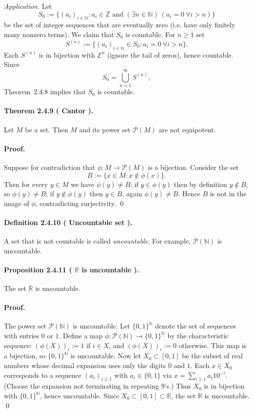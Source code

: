 \documentclass[12pt,a4paper]{article}
\newcommand{\N}{\mathbb{N}}
\newcommand{\Z}{\mathbb{Z}}
\newcommand{\R}{\mathbb{R}}
\newcommand{\NumberedDefinition}[3]{%
\paragraph*{Definition #1 ( #2 ).} #3\par}
\newcommand{\NumberedTheorem}[3]{%
\paragraph*{Theorem #1 ( #2 ).} #3\par}
\newcommand{\NumberedProposition}[3]{%
\paragraph*{Proposition #1 ( #2 ).} #3\par}
\theoremstyle{plain}
\theoremstyle{definition}
\theoremstyle{remark}
\begin{document}
\emph{Application.} Let
\[
	S_0 := \{ (a_i)_{i\in\N} : a_i\in\Z \text{ and } (\exists n\in\N)\ (a_i=0 \ \forall i>n)\}
\]
be the set of integer sequences that are eventually zero (i.e. have only finitely many nonzero terms). We claim that $S_0$ is countable. For $n\ge1$ set
\[
	S^{(n)} := \{ (a_i)_{i\in\N} \in S_0 : a_i=0 \ \forall i>n\}.
\]
Each $S^{(n)}$ is in bijection with $\Z^n$ (ignore the tail of zeros), hence countable. Since
\[
	S_0 = \bigcup_{n=1}^{\infty} S^{(n)},
\]
Theorem~2.4.8 implies that $S_0$ is countable.

\NumberedTheorem{2.4.9}{Cantor}{Let $M$ be a set. Then $M$ and its power set $\mathcal{P}(M)$ are not equipotent.}

\paragraph{Proof.} Suppose for contradiction that $\phi: M\to \mathcal{P}(M)$ is a bijection. Consider the set
\[
  B := \{ x\in M : x\notin \phi(x)\}.
\]
Then for every $y\in M$ we have $\phi(y)\ne B$: if $y\in \phi(y)$ then by definition $y\notin B$, so $\phi(y)\ne B$; if $y\notin \phi(y)$ then $y\in B$, again $\phi(y)\ne B$. Hence $B$ is not in the image of $\phi$, contradicting surjectivity. \qed

\NumberedDefinition{2.4.10}{Uncountable set}{A set that is not countable is called \emph{uncountable}. For example, $\mathcal{P}(\N)$ is uncountable.}

\NumberedProposition{2.4.11}{$\R$ is uncountable}{The set $\R$ is uncountable.}

\paragraph{Proof.} The power set $\mathcal{P}(\N)$ is uncountable. Let $\{0,1\}^{\N}$ denote the set of sequences with entries $0$ or $1$. Define a map $\phi: \mathcal{P}(\N) \to \{0,1\}^{\N}$ by the characteristic sequence: $(\phi(X))_i := 1$ if $i\in X$, and $(\phi(X))_i :=0$ otherwise. This map is a bijection, so $\{0,1\}^{\N}$ is uncountable. Now let $X_0\subset [0,1]$ be the subset of real numbers whose decimal expansion uses only the digits $0$ and $1$. Each $x\in X_0$ corresponds to a sequence $(a_i)_{i\ge1}$ with $a_i\in\{0,1\}$ via $x=\sum_{i\ge1} a_i 10^{-i}$. (Choose the expansion not terminating in repeating $9$'s.) Thus $X_0$ is in bijection with $\{0,1\}^{\N}$, hence uncountable. Since $X_0\subset [0,1]\subset \R$, the set $\R$ is uncountable. \qed
\end{document}
